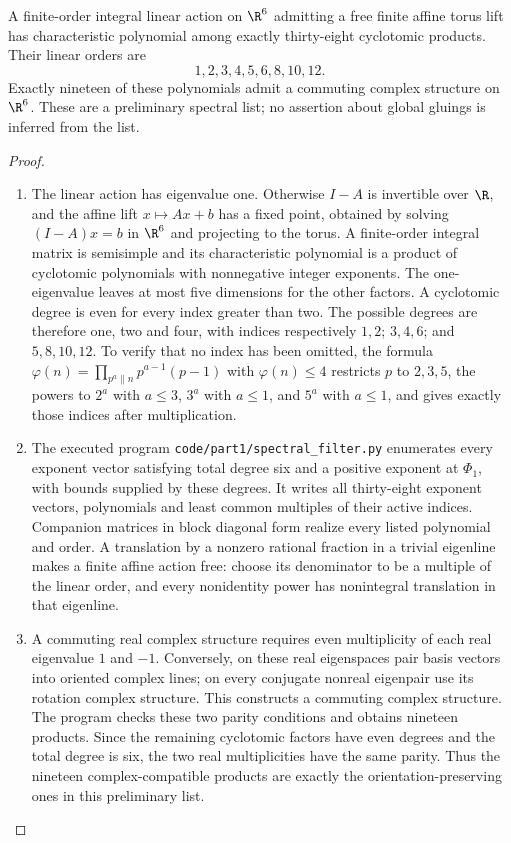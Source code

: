 \begin{theorem}\label{night:P1B.2}
A finite-order integral linear action on $\R^6$ admitting a
free finite affine torus lift has characteristic polynomial
among exactly thirty-eight cyclotomic products. Their linear
orders are
\[
 1,2,3,4,5,6,8,10,12.
\]
Exactly nineteen of these polynomials admit a commuting complex
structure on $\R^6$. These are a preliminary spectral list;
no assertion about global gluings is inferred from the list.
\end{theorem}
\begin{proof}
\begin{enumerate}[label=\arabic*.]
\item The linear action has eigenvalue one. Otherwise $I-A$ is
invertible over $\R$, and the affine lift $x\mapsto Ax+b$
has a fixed point, obtained by solving $(I-A)x=b$ in $\R^6$
and projecting to the torus. A finite-order integral matrix is
semisimple and its characteristic polynomial is a product of
cyclotomic polynomials with nonnegative integer exponents.
The one-eigenvalue leaves at most five dimensions for the other
factors. A cyclotomic degree is even for every index greater
than two. The possible degrees are therefore one, two and four,
with indices respectively $1,2$; $3,4,6$; and $5,8,10,12$.
To verify that no index has been omitted, the formula
$\varphi(n)=\prod_{p^a\parallel n}p^{a-1}(p-1)$ with
$\varphi(n)\le4$ restricts $p$ to $2,3,5$, the powers to
$2^a$ with $a\le3$, $3^a$ with $a\le1$, and $5^a$ with
$a\le1$, and gives exactly those indices after multiplication.

\item The executed program \texttt{code/part1/spectral\_filter.py}
enumerates every exponent vector satisfying total degree six
and a positive exponent at $\Phi_1$, with bounds supplied by
these degrees. It writes all thirty-eight exponent vectors,
polynomials and least common multiples of their active indices.
Companion matrices in block diagonal form realize every listed
polynomial and order. A translation by a nonzero rational
fraction in a trivial eigenline makes a finite affine action
free: choose its denominator to be a multiple of the linear
order, and every nonidentity power has nonintegral translation
in that eigenline.

\item A commuting real complex structure requires even multiplicity
of each real eigenvalue $1$ and $-1$. Conversely, on these real
eigenspaces pair basis vectors into oriented complex lines;
on every conjugate nonreal eigenpair use its rotation complex
structure. This constructs a commuting complex structure.
The program checks these two parity conditions and obtains
nineteen products. Since the remaining cyclotomic factors have
even degrees and the total degree is six, the two real
multiplicities have the same parity. Thus the nineteen
complex-compatible products are exactly the orientation-preserving
ones in this preliminary list.

\end{enumerate}
\end{proof}


